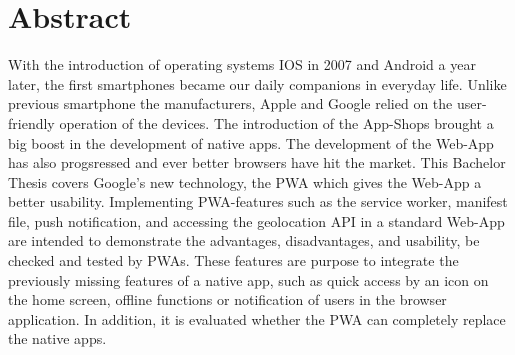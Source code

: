 \section*{\Large\bfseries Abstract}
With the introduction of operating systems IOS in 2007 and Android a year later, the first smartphones became our daily companions in everyday life.
Unlike previous smartphone the manufacturers, Apple and Google relied on the user-friendly operation of the devices.
The introduction of the App-Shops brought a big boost in the development of native apps.
The development of the \acl{Web-App} has also progsressed and ever better browsers have hit the market.
This Bachelor Thesis covers Google's new technology, the \acl{PWA} which gives   the \acl{Web-App} a better usability.
Implementing \acs{PWA}-features such as the service worker, manifest file, push notification, and accessing the geolocation API in a standard \acs{Web-App} are intended to demonstrate the advantages, disadvantages, and usability, be checked and tested by \acs{PWA}s. These features are purpose to integrate the previously missing features of a native app, such as quick access by an icon on the home screen, offline functions or notification of users in the browser application.
In addition, it is evaluated whether the \acs{PWA} can completely replace the native apps.

